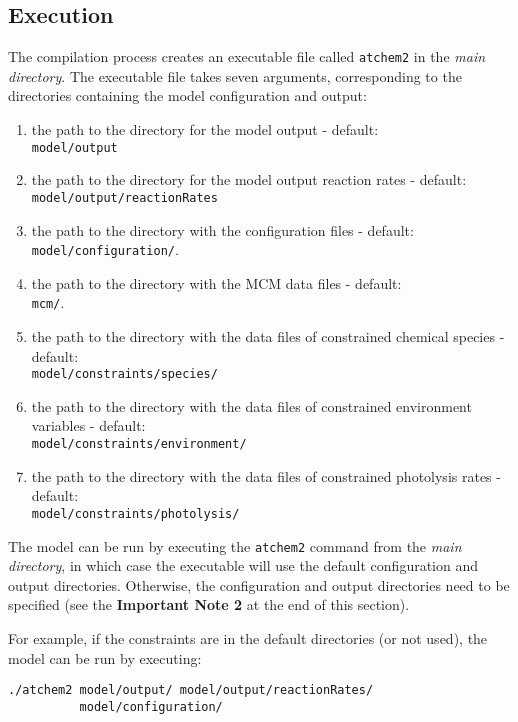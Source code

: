 \subsection{Execution} \label{subsec:execution}

The compilation process creates an executable file called
\texttt{atchem2} in the \emph{main directory}. The executable file
takes seven arguments, corresponding to the directories containing the
model configuration and output:

\begin{enumerate}
\item the path to the directory for the model output - default:\\
  \texttt{model/output}
\item the path to the directory for the model output reaction rates -
  default:\\ \texttt{model/output/reactionRates}
\item the path to the directory with the configuration files -
  default:\\ \texttt{model/configuration/}.
\item the path to the directory with the MCM data files - default:\\
  \texttt{mcm/}.
\item the path to the directory with the data files of constrained
  chemical species - default:\\ \texttt{model/constraints/species/}
\item the path to the directory with the data files of constrained
  environment variables - default:\\
  \texttt{model/constraints/environment/}
\item the path to the directory with the data files of constrained
  photolysis rates - default:\\ \texttt{model/constraints/photolysis/}
\end{enumerate}

The model can be run by executing the \texttt{atchem2} command from
the \emph{main directory}, in which case the executable will use the
default configuration and output directories. Otherwise, the
configuration and output directories need to be specified (see the
\textbf{Important Note 2} at the end of this section).

For example, if the constraints are in the default directories (or not
used), the model can be run by executing:

\begin{verbatim}
./atchem2 model/output/ model/output/reactionRates/
          model/configuration/
\end{verbatim}

